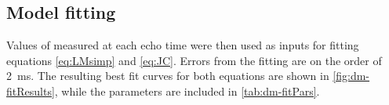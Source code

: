 \subsection{Model fitting}

Values of \Ttwo measured at each echo time were then used as inputs for fitting equations \ref{eq:LMsimp} and \ref{eq:JC}.
Errors from the \Ttwo fitting are on the order of \SI{2}{ms}.
The resulting best fit curves for both equations are shown in \autoref{fig:dm-fitResults}, while the parameters are included in \autoref{tab:dm-fitPars}.

\begin{landscape}
\begin{table}[h]
\centering

\caption[Best fit values to the experimental data at different fields]{Best fit values to the experimental data at different fields, shaded columns indicate fixed parameters in fitting. Note that the \TtwoO values are dependent on the state of the blood in the flow circuit, so are not necessarily reflective of the diffusion/exchange effects.}
\label{tab:dm-fitPars}



\vspace{1cm}

\end{table}
\end{landscape}
